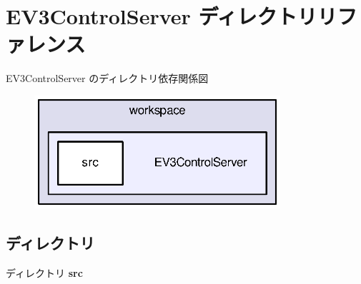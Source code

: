 \section{E\-V3\-Control\-Server ディレクトリリファレンス}
\label{dir_935dfa25861a3b3a01968faa3c34ea1f}
E\-V3\-Control\-Server のディレクトリ依存関係図\nopagebreak
\begin{figure}[H]
\begin{center}
\leavevmode
\includegraphics[width=258pt]{dir_935dfa25861a3b3a01968faa3c34ea1f_dep}
\end{center}
\end{figure}
\subsection*{ディレクトリ}
\begin{DoxyCompactItemize}
\item 
ディレクトリ {\bf src}
\end{DoxyCompactItemize}
